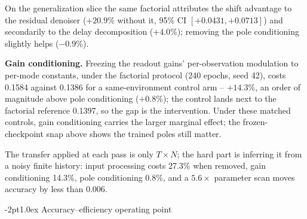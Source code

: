 \documentclass{article}
\makeatletter
\renewcommand\subsection{\@startsection{subsection}{2}{\z@}%
  {-2pt}{1.0ex}%
  {\normalfont\large\bfseries}}
\makeatother
\begin{document}
On the generalization slice the same
factorial attributes the shift advantage to the residual denoiser
($+20.9\%$ without it, 95\% CI $[+0.0431,+0.0713]$) and secondarily
to the delay decomposition ($+4.0\%$); removing the pole conditioning
slightly helps ($-0.9\%$).

\textbf{Gain conditioning.} Freezing the readout gains' per-observation modulation to per-mode
constants, under the factorial protocol (240 epochs, seed 42), costs
0.1584 against
0.1386 for a same-environment control arm -- $+14.3\%$, an order of
magnitude above pole conditioning ($+0.8\%$); the control lands next
to the factorial reference 0.1397, so the gap is the intervention.
Under these matched controls, gain conditioning carries the larger
marginal effect; the frozen-checkpoint snap above shows the trained
poles still matter.

The transfer applied at each pass is only $T{\times}N$; the hard part is
inferring it from a noisy finite history: input processing costs 27.3\%
when removed, gain conditioning 14.3\%, pole conditioning 0.8\%, and a
$5.6\times$ parameter scan moves accuracy by less than 0.006.

\subsection{Accuracy--efficiency operating point}
\label{ssec:main}
\end{document}

